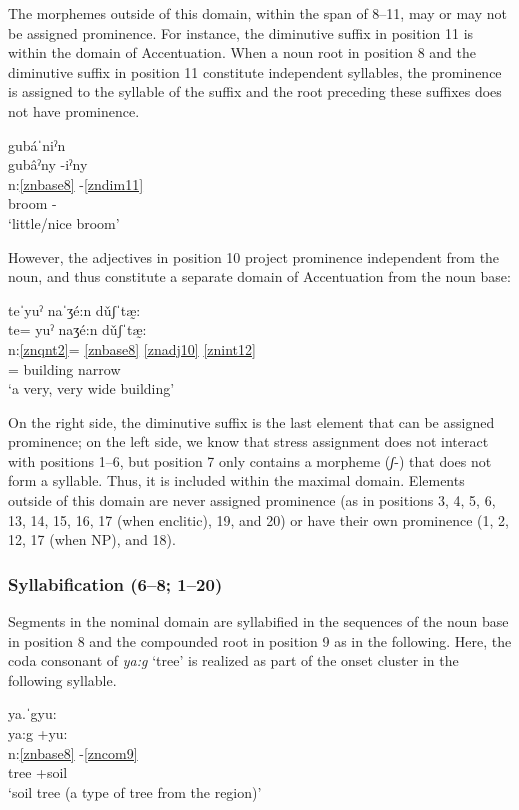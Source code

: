 \documentclass[output=paper]{langscibook}
\begin{document}
The morphemes outside of this domain, within the span of 8–11, may or may not be assigned prominence. For instance, the diminutive suffix in position 11 is within the domain of Accentuation. When a noun root in position 8 and the diminutive suffix in position 11 constitute independent syllables, the prominence is assigned to the syllable of the suffix and the root preceding these suffixes does not have prominence. 

\ea\label{ex:key:zap:128}
{gubáˈniˀn}\\
\glll gubâˀny -iˀny\\
n:\ref{znbase8}  -\ref{zndim11} \\
broom -\Dim{}\\
\glt `little/nice broom'
\z

However, the adjectives in position 10 project prominence independent from the noun, and thus constitute a separate domain of Accentuation from the noun base:

\ea\label{ex:key:zap:129}
{ teˈyuˀ naˈʒé:n dǔʃˈtæ̰:}\\
\glll te= yuˀ naʒé:n dǔʃˈtæ̰:\\
n:\ref{znqnt2}= \ref{znbase8} \ref{znadj10} \ref{znint12}\\
\Indf{}= building narrow \Intens{}\\
\glt`a very, very wide building'
\z

On the right side, the diminutive suffix is the last element that can be assigned prominence; on the left side, we know that stress assignment does not interact with positions 1–6, but position 7 only contains a morpheme (\textit{ʃ}-) that does not form a syllable. Thus, it is included within the maximal domain. Elements outside of this domain are never assigned prominence (as in positions 3, 4, 5, 6, 13, 14, 15, 16, 17 (when enclitic), 19, and 20) or have their own prominence (1, 2, 12, 17 (when NP), and 18).

\subsubsection{Syllabification (6–8; 1–20)}

Segments in the nominal domain are syllabified in the sequences of the noun base in position 8 and the compounded root in position 9 as in the following. Here, the coda consonant of \textit{ya:g} `tree' is realized as part of the onset cluster in the following syllable. 

\newpage

\ea\label{ex:key:zap:130}
{ya.ˈgyu:}\\
\glll ya:g +yu:\\
n:\ref{znbase8} -\ref{zncom9} \\
tree +soil\\
\glt `soil tree (a type of tree from the region)'
\z
\end{document}
